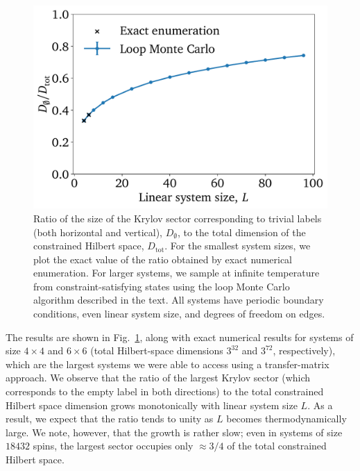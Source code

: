 \begin{figure}[ht!]
    \centering
    \includegraphics[width=0.6\linewidth]{img/weak_ratio.pdf}
    \caption[Evidence for weak shattering]{Ratio of the size of the Krylov sector corresponding to trivial labels (both horizontal and vertical), $D_\emptyset$, to the total dimension of the constrained Hilbert space, $D_\text{tot}$. For the smallest system sizes, we plot the exact value of the ratio obtained by exact numerical enumeration. For larger systems, we sample at infinite temperature from constraint-satisfying states using the loop Monte Carlo algorithm described in the text. All systems have periodic boundary conditions, even linear system size, and degrees of freedom on edges.}
    \label{fig:weak-vs-strong}
\end{figure}

The results are shown in Fig.~\ref{fig:weak-vs-strong}, along with exact numerical results for systems of size $4\times 4$ and $6 \times 6$ (total Hilbert-space dimensions $3^{32}$ and $3^{72}$, respectively), which are the largest systems we were able to access using a transfer-matrix approach. We observe that the ratio of the largest Krylov sector (which corresponds to the empty label in both directions) to the total constrained Hilbert space dimension grows monotonically with linear system size $L$. As a result, we expect that the ratio tends to unity as $L$ becomes thermodynamically large.
We note, however, that the growth is rather slow; even in systems of size $18432$ spins, the largest sector occupies only $\approx 3/4$ of the total constrained Hilbert space.



